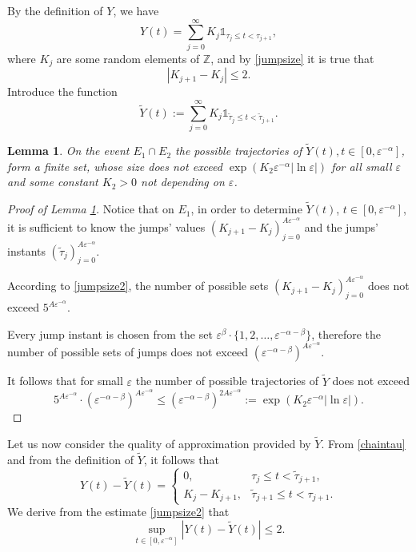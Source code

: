 \documentclass[12pt]{article}
\let\ep\varepsilon
\newcommand\Z{\mathbb Z}
\let\le\leqslant
\newtheorem{lemma}[theorem]{Lemma}
\theoremstyle{definition}
\begin{document}
By the definition of $Y$, we have
\[
    Y(t) = \sum_{j=0}^{\infty}K_j\mathds{1}_{\tau_j\le t<\tau_{j+1}},
\]
where $K_j$ are some random elements of $\Z$, and by \eqref{jumpsize} it is true that 
\begin{equation}\label{jumpsize2}
    |K_{j + 1} - K_{j}| \le 2. 
\end{equation}
Introduce the function
\[ 
    \tilde Y(t):=\sum_{j = 0}^{\infty}  K_j 
                \mathds{1}_{\tilde \tau_j \le t<\tilde\tau_{j+1}}.
\]

\begin{lemma}\label{sublemma3}
    On the event $E_1\cap E_2$ the possible trajectories of $\tilde Y(t), t\in[0,\ep^{-\alpha}]$, 
    form a finite set, whose size does not exceed  $\exp(K_2\ep^{-\alpha}|\ln\ep|)$  for all small
    $\ep$ and some constant $K_2>0$ not depending on $\ep$.
\end{lemma}

\begin{proof}[Proof of Lemma \ref{sublemma3}]
Notice that on $E_1$, in order to determine  $\tilde Y(t)$, $ t\in[0,\ep^{-\alpha}]$,
it is sufficient to know the jumps' values $(K_{j+1} - K_j)_{j = 0}^{A\ep^{-\alpha}}$
and the jumps' instants $(\tilde\tau_{j})_{j=0}^{A\ep^{-\alpha}}$. 
    
According to \eqref{jumpsize2}, the number of possible sets 
$(K_{j+1} - K_j)_{j = 0}^{A\ep^{-\alpha}}$ does not exceed $5^{A\ep^{-\alpha}}$. 
    
Every jump instant  is chosen from the set $\ep^\beta \cdot \{1,2, \dots, \ep^{-\alpha-\beta}\}$, 
therefore the number of possible sets of jumps does not exceed $(\ep^{-\alpha-\beta})^{A\ep^{-\alpha}}$. 
    
It follows that for small $\ep$ the number of possible trajectories of $\tilde Y$ does not exceed
\[
      5^{A\ep^{-\alpha}} \cdot  (\ep^{-\alpha-\beta})^{A\ep^{-\alpha}} 
      \le  (\ep^{-\alpha-\beta})^{2A\ep^{-\alpha}} 
      := \exp{(K_2\ep^{-\alpha}|\ln\ep|)}.
\]      
\end{proof}

Let us now consider the quality of approximation provided by $\tilde Y$.
From \eqref{chaintau} and from the definition of $\tilde Y$, it follows that
\[
   Y(t) - \tilde Y(t) =
   \begin{cases}   0,            &    \tau_j\le t< \tilde\tau_{j+1}, \\
                   K_j- K_{j+1}, & \tilde\tau_{j+1}\le t< \tau_{j+1}.
    \end{cases}
\]
We derive from the estimate \eqref{jumpsize2} that 
\begin{equation}\label{mainlemma3: difference between Y and tilde Y}
    \sup_{t\in[0,\ep^{-\alpha}]}|Y(t) - \tilde Y(t)| \le 2.
\end{equation}
\end{document}
